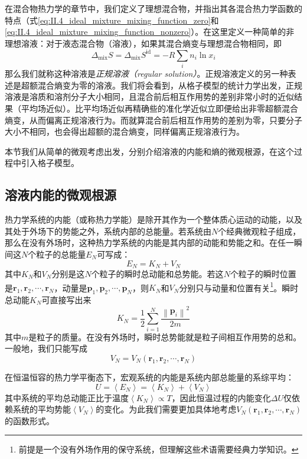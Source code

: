 \documentclass[main.tex]{subfiles}
\begin{document}
在混合物热力学的章节中，我们定义了理想混合物，并指出其各混合热力学函数的特点（式\eqref{eq:II.4_ideal_mixture_mixing_function_zero}和\eqref{eq:II.4_ideal_mixture_mixing_function_nonzero}）。在这里定义一种简单的非理想溶液：对于液态混合物（溶液），如果其混合熵变与理想混合物相同，即
\[\Delta_\text{mix}S=\Delta_\text{mix}S^\text{id}=-R\sum_in_i\ln x_i\]
那么我们就称这种溶液是\emph{正规溶液（regular solution）}。正规溶液定义的另一种表述是超额混合熵变为零的溶液。我们将会看到，从格子模型的统计力学出发，正规溶液是溶质和溶剂分子大小相同，且混合前后相互作用势的差别非常小时的近似结果（平均场近似）。比平均场近似再精确些的准化学近似立即便给出非零超额混合熵变，从而偏离正规溶液行为。而就算混合前后相互作用势的差别为零，只要分子大小不相同，也会得出超额的混合熵变，同样偏离正规溶液行为。

本节我们从简单的微观考虑出发，分别介绍溶液的内能和熵的微观根源，在这个过程中引入格子模型。

\subsection{溶液内能的微观根源}\label{sec:III.1.1_internal_energy_micro_origin}
热力学系统的内能（或称热力学能）是除开其作为一个整体质心运动的动能，以及其处于外场下的势能之外，系统内部的总能量。若系统由$N$个经典微观粒子组成，那么在没有外场时，这种热力学系统的内能是其内部的动能和势能之和。在任一瞬间这$N$个粒子的总能量$E_N$可写成：
\[E_N=K_N+V_N\]
其中$K_N$和$V_N$分别是这$N$个粒子的瞬时总动能和总势能。若这$N$个粒子的瞬时位置是$\mathbf{r}_1,\mathbf{r}_2,\cdots,\mathbf{r}_N$，动量是$\mathbf{p}_1,\mathbf{p}_2,\cdots,\mathbf{p}_N$，则$K_N$和$V_N$分别只与动量和位置有关\footnote{前提是一个没有外场作用的保守系统，但理解这些术语需要经典力学知识。}。瞬时总动能$K_N$可直接写出来
\[K_N=\frac{1}{2}\sum_{i=1}^N\frac{\left\|\mathbf{p}_i\right\|^2}{2 m}\]
其中$m$是粒子的质量。在没有外场时，瞬时总势能就是粒子间相互作用势的总和。一般地，我们只能写成
\[V_N=V_N\left(\mathbf{r}_1,\mathbf{r}_2,\cdots,\mathbf{r}_N\right)\]

在恒温恒容的热力学平衡态下，宏观系统的内能是系统内部总能量的系综平均：
\[U=\left\langle E_N\right\rangle=\left\langle K_N\right\rangle+\left\langle V_N\right\rangle\]
其中系统的平均总动能正比于温度$\left\langle K_N\right\rangle\propto T$，因此恒温过程的内能变化$\Delta U$仅依赖系统的平均势能$\left\langle V_N\right\rangle$的变化。为此我们需要更加具体地考虑$V_N\left(\mathbf{r}_1,\mathbf{r}_2,\cdots,\mathbf{r}_N\right)$的函数形式。
\end{document}
